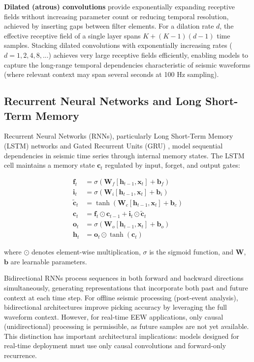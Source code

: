 \documentclass[review,authoryear]{elsarticle}
\begin{document}
\textbf{Dilated (atrous) convolutions} provide exponentially expanding receptive fields without increasing parameter count or reducing temporal resolution, achieved by inserting gaps between filter elements. For a dilation rate $d$, the effective receptive field of a single layer spans $K + (K-1)(d-1)$ time samples. Stacking dilated convolutions with exponentially increasing rates ($d = 1, 2, 4, 8, ...$) achieves very large receptive fields efficiently, enabling models to capture the long-range temporal dependencies characteristic of seismic waveforms (where relevant context may span several seconds at 100 Hz sampling).

\subsection{Recurrent Neural Networks and Long Short-Term Memory}

Recurrent Neural Networks (RNNs), particularly Long Short-Term Memory (LSTM) networks \citep{hochreiter1997long} and Gated Recurrent Units (GRU) \citep{cho2014learning}, model sequential dependencies in seismic time series through internal memory states. The LSTM cell maintains a memory state $\mathbf{c}_t$ regulated by input, forget, and output gates:

\begin{align}
\mathbf{f}_t &= \sigma(\mathbf{W}_f[\mathbf{h}_{t-1}, \mathbf{x}_t] + \mathbf{b}_f) \label{eq:lstm_forget}\\
\mathbf{i}_t &= \sigma(\mathbf{W}_i[\mathbf{h}_{t-1}, \mathbf{x}_t] + \mathbf{b}_i) \label{eq:lstm_input}\\
\tilde{\mathbf{c}}_t &= \tanh(\mathbf{W}_c[\mathbf{h}_{t-1}, \mathbf{x}_t] + \mathbf{b}_c) \label{eq:lstm_candidate}\\
\mathbf{c}_t &= \mathbf{f}_t \odot \mathbf{c}_{t-1} + \mathbf{i}_t \odot \tilde{\mathbf{c}}_t \label{eq:lstm_cell}\\
\mathbf{o}_t &= \sigma(\mathbf{W}_o[\mathbf{h}_{t-1}, \mathbf{x}_t] + \mathbf{b}_o) \label{eq:lstm_output}\\
\mathbf{h}_t &= \mathbf{o}_t \odot \tanh(\mathbf{c}_t) \label{eq:lstm_hidden}
\end{align}

\noindent where $\odot$ denotes element-wise multiplication, $\sigma$ is the sigmoid function, and $\mathbf{W}$, $\mathbf{b}$ are learnable parameters.

Bidirectional RNNs \citep{schuster1997bidirectional} process sequences in both forward and backward directions simultaneously, generating representations that incorporate both past and future context at each time step. For offline seismic processing (post-event analysis), bidirectional architectures improve picking accuracy by leveraging the full waveform context. However, for real-time EEW applications, only causal (unidirectional) processing is permissible, as future samples are not yet available. This distinction has important architectural implications: models designed for real-time deployment must use only causal convolutions and forward-only recurrence.
\end{document}

